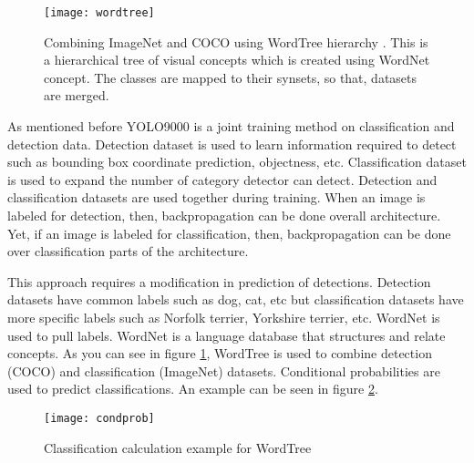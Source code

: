 \documentclass{article}
\begin{document}
\begin{enumerate}
    \begin{figure}
        \centering
        \texttt{[image: wordtree]}
        \caption{Combining ImageNet and COCO using WordTree hierarchy \cite{yolo9000cite}. 
        This is a hierarchical tree of visual concepts which is created 
        using WordNet concept. The classes are mapped to their synsets, so that, 
        datasets are merged.}
        \label{fig:wordtree1}
    \end{figure}
    
    As mentioned before YOLO9000 is a joint training method on classification and detection 
    data. Detection dataset is used to learn information required to detect such as bounding 
    box coordinate prediction, objectness, etc. Classification dataset is used to expand the 
    number of category detector can detect. Detection and classification datasets are used together 
    during training. When an image is labeled for detection, then, backpropagation 
    can be done overall architecture. Yet, if an image is labeled for classification, then, 
    backpropagation can be done over classification parts of the architecture. \par 
    
    This approach requires a modification in prediction of detections. Detection datasets have common 
    labels such as dog, cat, etc but classification datasets have more specific labels such as Norfolk 
    terrier, Yorkshire terrier, etc. WordNet is used to pull labels. WordNet is a language database that 
    structures and relate concepts. As you can see in figure \ref{fig:wordtree1}, WordTree is used to combine 
    detection (COCO) and classification (ImageNet) datasets. Conditional probabilities are used 
    to predict classifications. An example can be seen in figure \ref{fig:condprob1}.
    
    \begin{figure}
        \centering
        \texttt{[image: condprob]}
        \caption{Classification calculation example for WordTree \cite{yolo9000cite}}
        \label{fig:condprob1}
    \end{figure}
\end{enumerate}
\end{document}
